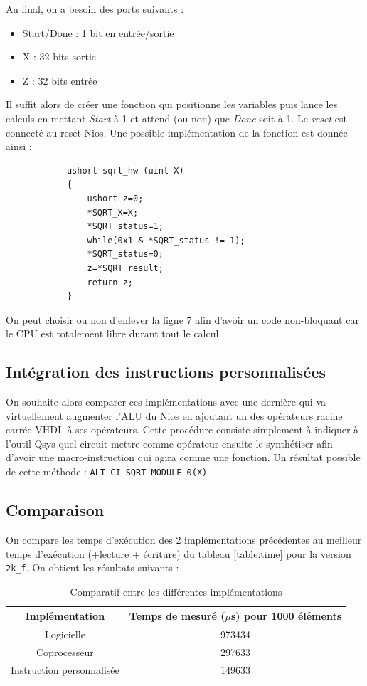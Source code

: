 \documentclass[12pt,a4paper]{article}
\begin{document}
Au final, on a besoin des ports suivants :
\begin{itemize}
	\item Start/Done : 1 bit en entrée/sortie
	\item X  : 32 bits sortie
	\item Z : 32 bits entrée
\end{itemize}

Il suffit alors de créer une fonction qui positionne les variables puis lance les calculs en mettant \textit{Start} à 1 et attend (ou non) que \textit{Done} soit à 1. Le \textit{reset} est connecté au reset Nios. Une possible implémentation de la fonction est donnée ainsi :

\begin{verbatim}
			ushort sqrt_hw (uint X)
			{
				ushort z=0;
				*SQRT_X=X;
				*SQRT_status=1;
				while(0x1 & *SQRT_status != 1);
				*SQRT_status=0;
				z=*SQRT_result;
				return z;
			}
\end{verbatim}    

On peut choisir ou non d'enlever la ligne 7 afin d'avoir un code non-bloquant car le CPU est totalement libre durant tout le calcul.

\subsection{Intégration des instructions personnalisées}
On souhaite alors comparer ces implémentations avec une dernière qui va virtuellement augmenter l'ALU du Nios en ajoutant un des opérateurs racine carrée VHDL à ses opérateurs. Cette procédure consiste simplement à indiquer à l'outil Qsys quel circuit mettre comme opérateur ensuite le synthétiser afin d'avoir une macro-instruction qui agira comme une fonction. Un résultat possible de cette méthode : \texttt{ALT_CI_SQRT_MODULE_0(X)}

\subsection{Comparaison}
On compare les temps d'exécution des 2 implémentations précédentes au meilleur temps d'exécution (+lecture + écriture) du tableau \ref{table:time} pour la version \texttt{2k\_f}. On obtient les résultats suivants :
\begin{table}[H]
	\centering
	\ttfamily
	\begin{tabular}{c|c}
		Implémentation & Temps de mesuré ($\mu$s)  pour 1000 éléments\\ \hline  
		Logicielle & 973434\\
		Coprocesseur  & 297633\\
		Instruction personnalisée & 149633\\
	\end{tabular} 
\rmfamily
\caption{Comparatif entre les différentes implémentations}
\end{table}
\end{document}
